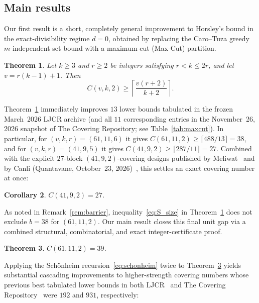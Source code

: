 \documentclass[11pt,a4paper]{article}
\newtheorem{theorem}{Theorem}[section]
\newtheorem{corollary}[theorem]{Corollary}
\theoremstyle{definition}
\theoremstyle{remark}
\begin{document}
\subsection{Main results}

Our first result is a short, completely general improvement to Horsley's bound in the exact-divisibility regime $d = 0$, obtained by replacing the Caro--Tuza greedy $m$-independent set bound with a maximum cut (Max-Cut) partition.

\begin{theorem}\label{thm:maxcut}
  Let $k \ge 3$ and $r \ge 2$ be integers satisfying $r < k \le 2r$, and let $v = r(k-1) + 1$. Then
  \begin{equation}\label{eq:maxcut}
    C(v,k,2) \ge \left\lceil \frac{v(r+2)}{k+2} \right\rceil.
  \end{equation}
\end{theorem}

Theorem~\ref{thm:maxcut} immediately improves $13$ lower bounds tabulated in the frozen March~2026 LJCR archive (and all $11$ corresponding entries in the November~26, 2026 snapshot of The Covering Repository; see Table~\ref{tab:maxcut}). In particular, for $(v,k,r) = (61,11,6)$ it gives $C(61,11,2) \ge \lceil 488/13 \rceil = 38$, and for $(v,k,r) = (41,9,5)$ it gives $C(41,9,2) \ge \lceil 287/11 \rceil = 27$. Combined with the explicit $27$-block $(41,9,2)$-covering designs published by Meliwat~\cite{Meliwat2026} and by Canli (Quantavane, October~23, 2026)~\cite{Canli2026}, this settles an exact covering number at once:

\begin{corollary}\label{cor:41}
  $C(41,9,2) = 27$.
\end{corollary}

As noted in Remark~\ref{rem:barrier}, inequality~\eqref{eq:S_size} in Theorem~\ref{thm:maxcut} does not exclude $b = 38$ for $(61,11,2)$. Our main result closes this final unit gap via a combined structural, combinatorial, and exact integer-certificate proof.

\begin{theorem}\label{thm:main}
  $C(61,11,2) = 39$.
\end{theorem}

Applying the Sch\"onheim recursion~\eqref{eq:schonheim} twice to Theorem~\ref{thm:main} yields substantial cascading improvements to higher-strength covering numbers whose previous best tabulated lower bounds in both LJCR~\cite{GordonLJCR} and The Covering Repository~\cite{AcerbiCR} were $192$ and $931$, respectively:
\end{document}
